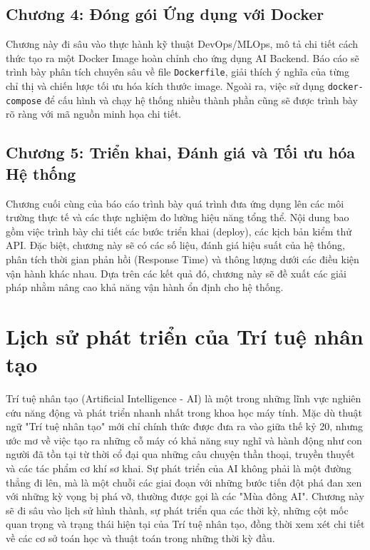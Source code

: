 \documentclass[12pt,a4paper]{article}
\begin{document}
\subsection*{Chương 4: Đóng gói Ứng dụng với Docker}
Chương này đi sâu vào thực hành kỹ thuật DevOps/MLOps, mô tả chi tiết cách thức tạo ra một Docker Image hoàn chỉnh cho ứng dụng AI Backend. Báo cáo sẽ trình bày phân tích chuyên sâu về file \texttt{Dockerfile}, giải thích ý nghĩa của từng chỉ thị và chiến lược tối ưu hóa kích thước image. Ngoài ra, việc sử dụng \texttt{docker-compose} để cấu hình và chạy hệ thống nhiều thành phần cũng sẽ được trình bày rõ ràng với mã nguồn minh họa chi tiết.

\subsection*{Chương 5: Triển khai, Đánh giá và Tối ưu hóa Hệ thống}
Chương cuối cùng của báo cáo trình bày quá trình đưa ứng dụng lên các môi trường thực tế và các thực nghiệm đo lường hiệu năng tổng thể. Nội dung bao gồm việc trình bày chi tiết các bước triển khai (deploy), các kịch bản kiểm thử API. Đặc biệt, chương này sẽ có các số liệu, đánh giá hiệu suất của hệ thống, phân tích thời gian phản hồi (Response Time) và thông lượng dưới các điều kiện vận hành khác nhau. Dựa trên các kết quả đó, chương này sẽ đề xuất các giải pháp nhằm nâng cao khả năng vận hành ổn định cho hệ thống.


\newpage
\section{Lịch sử phát triển của Trí tuệ nhân tạo}

Trí tuệ nhân tạo (Artificial Intelligence - AI) là một trong những lĩnh vực nghiên cứu năng động và phát triển nhanh nhất trong khoa học máy tính. Mặc dù thuật ngữ "Trí tuệ nhân tạo" mới chỉ chính thức được đưa ra vào giữa thế kỷ 20, nhưng ước mơ về việc tạo ra những cỗ máy có khả năng suy nghĩ và hành động như con người đã tồn tại từ thời cổ đại qua những câu chuyện thần thoại, truyền thuyết và các tác phẩm cơ khí sơ khai. Sự phát triển của AI không phải là một đường thẳng đi lên, mà là một chuỗi các giai đoạn với những bước tiến đột phá đan xen với những kỳ vọng bị phá vỡ, thường được gọi là các "Mùa đông AI". Chương này sẽ đi sâu vào lịch sử hình thành, sự phát triển qua các thời kỳ, những cột mốc quan trọng và trạng thái hiện tại của Trí tuệ nhân tạo, đồng thời xem xét chi tiết về các cơ sở toán học và thuật toán trong những thời kỳ đầu.
\end{document}
